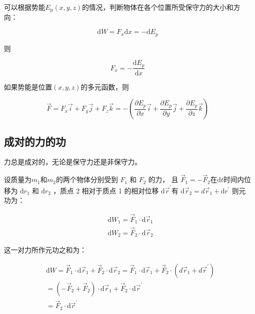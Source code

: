 \documentclass[
	12pt, %
	a4paper, %
]{myLegrandOrangeBook}
\newcommand{\rmd}{\mathrm{d}}
\begin{document}
    可以根据势能\(E_{\mathrm{p}}\left(x,y,z\right)\)的情况，判断物体在各个位置所受保守力的大小和方向：

    $$
        \rmd W=F_x \rmd x=-\rmd E_p
    $$

    则

    \begin{equation}
        F_x=-\frac{\rmd E_p}{\rmd x}
    \end{equation}

    如果势能是位置\(\left(x,y,z\right)\)的多元函数，则

    \begin{equation}
        \overrightarrow{F}=F_x \overrightarrow{i}+F_y \overrightarrow{j}+F_z \overrightarrow{k}=
        -\left(\frac{\partial E_p}{\partial x} \overrightarrow{i}+\frac{\partial E_p}{\partial y} \overrightarrow{j}+\frac{\partial E_p}{\partial z} \overrightarrow{k}\right)
    \end{equation}

    \subsection{成对的力的功}

    力总是成对的，无论是保守力还是非保守力。

    设质量为$m_1$和$m_2$的两个物体分别受到 $F_1$ 和 $F_2$ 的力，
    且 $\overrightarrow{F}_1=-\overrightarrow{F}_2$在$\rmd t$时间内位移为 $\rmd r_1$
    和 $\rmd r_2$ ，质点 2 相对于质点 1 的相对位移 $\rmd \overrightarrow{r}^{\prime}$有
    $\rmd \overrightarrow{r}_2=d \overrightarrow{r}_1+\rmd r^{\prime}$ 则元功为：

    $$
        \begin{aligned}
        & \rmd W_1=\overrightarrow{F}_1 \cdot \rmd \overrightarrow{r}_1 \\
        & \rmd W_2=\overrightarrow{F}_2 \cdot \rmd \overrightarrow{r}_2
        \end{aligned}
    $$

    这一对力所作元功之和为：

    $$
    \begin{aligned}
        & \rmd W=\overrightarrow{F}_1 \cdot \rmd \overrightarrow{r}_1+\overrightarrow{F}_2 \cdot \rmd \overrightarrow{r}_2=\overrightarrow{F}_1 \cdot\rmd\overrightarrow{r}_1+\overrightarrow{F}_2 \cdot\left(d \overrightarrow{r}_1+d \overrightarrow{r}^{\prime}\right) \\
        & =\left(-\overrightarrow{F}_2+\overrightarrow{F}_2\right) \cdot\rmd\overrightarrow{r}_1+\overrightarrow{F}_2 \cdot\rmd\overrightarrow{r}^{\prime} \quad \\
        & =\overrightarrow{F}_2 \cdot\rmd\overrightarrow{r}^{\prime}
    \end{aligned}
    $$
\end{document}
